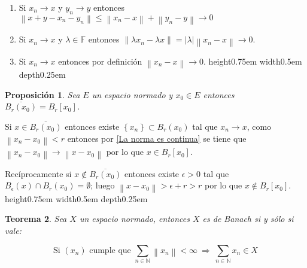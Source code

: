 \documentclass[11pt]{article}
\newcommand{\N}{{\mathbb{N}}}
\newcommand{\norm}[1]{\left\lVert#1\right\rVert}
\newcommand{\abs}[1]{\left\lvert#1\right\rvert}
\newcommand{\sett}[1]{\left\lbrace#1\right\rbrace}
\newcommand{\Bigsum}[2]{\sum\limits_{#1}{#2}}
\newtheorem{theorem}{Teorema}
\numberwithin{theorem}{subsection}
\newtheorem{proposition}[theorem]{Proposici\'on}
\newenvironment{proof}[1][Demostraci\'on]{\begin{trivlist}
		\item[\hskip \labelsep {\bfseries #1}]}{\end{trivlist}}
\newcommand{\qed}{\nobreak \ifvmode \relax \else
	\ifdim\lastskip<1.5em \hskip-\lastskip
	\hskip1.5em plus0em minus0.5em \fi \nobreak
	\vrule height0.75em width0.5em depth0.25em\fi}
\begin{document}
\begin{proof}
	\begin{enumerate}
		\item Si $x_n \rightarrow x$ y $y_n \rightarrow y$ entonces $\norm{x+y - x_n - y_n} \leq \norm{x_n -x} + \norm{y_n -y} \rightarrow 0$
		\item Si $x_n \rightarrow x$ y $\lambda \in \mathbb{F}$ entonces $\norm{\lambda x_n - \lambda x} = \abs{\lambda} \norm{x_n - x} \rightarrow 0$.
		\item Si $x_n \rightarrow x$ entonces por definici\'on $\norm{x_n -x} \rightarrow 0$. \qed
	\end{enumerate}
\end{proof}

\begin{proposition}
	Sea $E$ un espacio normado y $x_0 \in E$ entonces $\overline{B_r(x_0)} = B_r[x_0]$.
\end{proposition}

\begin{proof}
	Si $x \in \overline{B_r(x_0)}$ entonces existe $\sett{x_n} \subset B_r(x_0)$ tal que $x_n \rightarrow x$, como $\norm{x_n - x_0} < r$ entonces por \ref{La norma es continua} se tiene que $\norm{x_n - x_0} \rightarrow \norm{x - x_0}$ por lo que $x \in B_r[x_0]$.
	
	Rec\'iprocamente si $x \not \in \overline{B_r(x_0)}$ entonces existe $\epsilon > 0$ tal que $B_{\epsilon}(x) \cap B_r(x_0) = \emptyset$; luego $\norm{x - x_0} > \epsilon + r > r$ por lo que $x \not \in B_{r}[x_0]$. \qed
\end{proof}

\begin{theorem}
	\label{Banach si y solo si abs convergente es convergente}
	Sea $X$ un espacio normado, entonces $X$ es de Banach si y s\'olo si vale:
	
	\begin{equation}
		\label{eq: Condicion de Banach}
		\text{Si } \left(x_n\right) \text{ cumple que } \Bigsum{n \in \N}{\norm{x_n}} < \infty \ \Longrightarrow \ \Bigsum{n \in \N}{x_n} \in X
	\end{equation}
	
\end{theorem}
\end{document}
